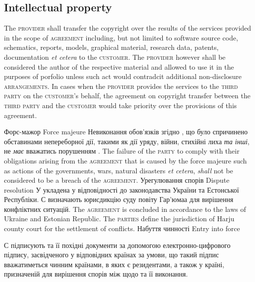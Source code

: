 \begin{Form}
\begin{paracol}{3}
{        \subsection{Intellectual property}
        The \textsc{provider} shall transfer the copyright over the results of the services provided in the scope of \textsc{agreement} including, but not limited to software source code, schematics, reports, models, graphical material, research data, patents, documentation \emph{et ce\-te\-ra} to the \textsc{customer}. The \textsc{provider} however shall be considered the author of the respective material and allowed to use it in the purposes of porfolio unless such act would contradcit additional non-disclosure \textsc{arrangements}. In cases when the \textsc{provider} provides the services to the \textsc{third party} on the \textsc{customer}'s behalf, the agreement on copyright transfer between the \textsc{third party} and the \textsc{customer} would take priority over the provisions of this agreement.}
        {}
      \clause
        {Форс-мажор}
        {Force majeure}
        {}
        {Невиконання  обов'язків згідно , що було спричинено обставинами непереборної дії, такими як дії уряду, війни, стихійні лиха \emph{та інші}, не \emph{має} вважатись порушенням .}
        {The failure of the \textsc{party} to comply with their obligations arising from the \textsc{agreement} that is caused by the force majeure such as actions of the governments, wars, natural disasters \emph{et cetera}, \emph{shall} not be considered to be a breach of the \textsc{agreement}.}
        {}
      \clause
        {Урегулювання спорів}
        {Dispute resolution}
        {}
        {У укладена у відповідності до законодавства України та Естонської Республіки. С визначають юрисдикцію суду повіту Гар'юмаа для вирішення конфліктних ситуацій.}
        {The \textsc{agreement} is concluded in accordance to the laws of Ukraine and Estonian Republic. The \textsc{parties} define the jurisdiction of Harju county court for the settlement of conflicts.}
        {}
      \clause
        {Набуття чинності}
        {Entry into force}
        {}
        {С підписують  та її похідні документи за допомогою електронно-цифрового підпису, засвідченого у відповідних країнах за умови, що такий підпис вважатиметься чинним країнами, в яких  є резидентами, а також у країні, призначеній для вирішення спорів між  щодо  та її виконання.

}
\end{paracol}
\end{Form}
